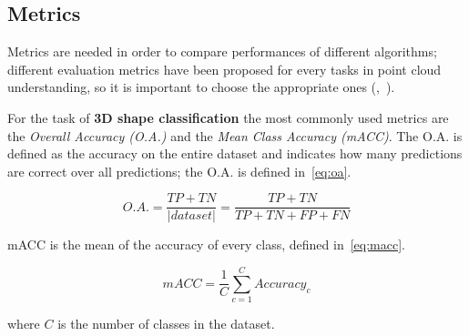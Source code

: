 

\subsection{Metrics}
\label{subsec:metrics}

Metrics are needed in order to compare performances of different algorithms; different evaluation metrics have been proposed for every tasks in point cloud understanding, so it is important to choose the appropriate ones (\cite{lu2020deep},~\cite{guo2020deep}).

For the task of \textbf{3D shape classification} the most commonly used metrics are the \textit{Overall Accuracy (O.A.)} and the \textit{Mean Class Accuracy (mACC)}. The O.A. is defined as the accuracy on the entire dataset and indicates how many predictions are correct over all predictions; the O.A. is defined in~\ref{eq:oa}.

\begin{equation}
\label{eq:oa}
    O.A. = \frac{TP+TN}{|dataset|}=\frac{TP+TN}{TP+TN+FP+FN}
\end{equation}

mACC is the mean of the accuracy of every class, defined in~\ref{eq:macc}.

\begin{equation}
\label{eq:macc}
    mACC = \frac{1}{C} \sum\limits_{c=1}^C Accuracy_c
\end{equation}

where $C$ is the number of classes in the dataset.


